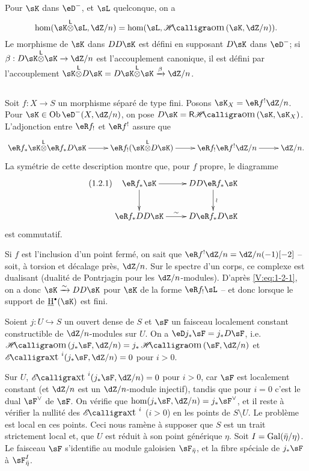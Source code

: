 Pour $\sK$ dans $\eD^-$, et $\sL$ quelconque, on a 
\[
  \hom(\sK\lotimes \sL,\dZ/n) = \hom(\sL,\Hom(\sK,\dZ/n)) \text{.}
\]
Le morphisme de $\sK$ dans $DD\sK$ est défini en supposant $D\sK$ dans 
$\eD^-$; si $\beta:D\sK\lotimes\sK\to \dZ/n$ est l'accouplement canonique, il 
est défini par l'accouplement 
$\sK\lotimes D\sK=D\sK\lotimes \sK \xrightarrow\beta \dZ/n$. 





\subsection{}\label{V:1-2}

Soit $f:X\to S$ un morphisme séparé de type fini. Posons 
$\sK_X=\eR f^!\dZ/n$. Pour $\sK\in \ob\eD^-(X,\dZ/n)$, on pose 
$D\sK = \rHom(\sK,\sK_X)$. L'adjonction entre $\eR f_!$ et $\eR f^!$ 
assure que 
\[\xymatrix{
  \eR f_\ast \sK\lotimes \eR f_\ast D\sK \ar[r] 
    & \eR f_! (\sK\lotimes D\sK) \ar[r] 
    & \eR f_! \eR f^! \dZ/n \ar[r] 
    & \dZ/n \text{.}
}\]
La symétrie de cette description montre que, pour $f$ propre, le diagramme 
\begin{equation*}\tag{1.2.1}\label{V:eq:1-2-1}
\xymatrix{
  \eR f_\ast \sK \ar[r] \ar[d] 
    & D D \eR f_\ast \sK \ar[d]^-\wr \\
  \eR f_\ast D D \sK \ar[r]^\sim 
    & D\eR f_\ast D\sK
}
\end{equation*}
est commutatif. 

Si $f$ est l'inclusion d'un point fermé, on sait que 
$\eR f^!\dZ/n=\dZ/n(-1)[-2]$ -- soit, à torsion et décalage près, $\dZ/n$. 
Sur le spectre d'un corps, ce complexe est dualisant (dualité de Pontrjagin 
pour les $\dZ/n$-modules). D'après \eqref{V:eq:1-2-1}, on a donc 
$\sK\iso D D\sK$ pour $\sK$ de la forme $\eR f_!\sL$ -- et donc lorsque le 
support de $\underline\h^\bullet(\sK)$ est fini. 





\begin{theorem_}\label{V:1-3}
Soient $j:U\hookrightarrow S$ un ouvert dense de $S$ et $\sF$ un faisceau 
localement constant constructible de $\dZ/n$-modules sur $U$. On a 
$\eD j_\ast \sF = j_\ast D \sF$, i.e. $\Hom(j_\ast \sF,\dZ/n) = j_\ast\Hom(\sF,\dZ/n)$ et $\Ext^i(j_\ast\sF,\dZ/n) = 0$ pour $i>0$.
\end{theorem_}

Sur $U$, $\Ext^i(j_\ast\sF,\dZ/n)=0$ pour $i>0$, car $\sF$ est localement 
constant (et $\dZ/n$ est un $\dZ/n$-module injectif), tandis que pour $i=0$ 
c'est le dual $\sF^\vee$ de $\sF$. On vérifie que 
$\hom(j_\ast\sF,\dZ/n)=j_\ast\sF^\vee$, et il reste à vérifier la nullité 
des $\Ext^i$ ($i>0$) en les points de $S\setminus U$. Le problème est local 
en ces points. Ceci nous ramène à supposer que $S$ est un trait strictement 
local et, que $U$ est réduit à son point générique $\eta$. Soit 
$I=\operatorname{Gal}(\bar\eta/\eta)$. Le faisceau $\sF$ s'identifie au module galoisien 
$\sF_{\bar\eta}$, et la fibre spéciale de $j_\ast \sF$ à 
$\sF_{\bar\eta}^I$. 

